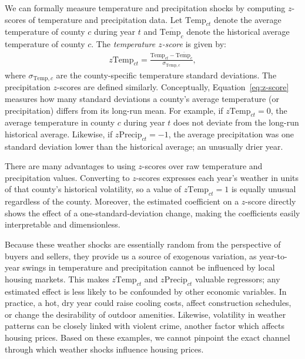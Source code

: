 \documentclass[12pt,reqno]{amsart}
\theoremstyle{definition}
\begin{document}
    We can formally measure temperature and precipitation shocks by computing $z$-scores of temperature and precipitation data. Let $\text{Temp}_{ct}$ denote the average temperature of county $c$ during year $t$ and $\overline{\text{Temp}_c}$ denote the historical average temperature of county $c$. The \textit{temperature $z$-score} is given by:
        \begin{equation}\label{eq:z-score}
        \begin{split}
            z\text{Temp}_{ct} = \frac{\text{Temp}_{ct} - \overline{\text{Temp}_c}}{\sigma_{\text{Temp},c}},
        \end{split}
        \end{equation} 
    where $\sigma_{\text{Temp},c}$ are the county-specific temperature standard deviations. The precipitation $z$-scores are defined similarly. Conceptually, Equation~\ref{eq:z-score} measures how many standard deviations a county's average temperature (or precipitation) differs from its long-run mean. For example, if $z\text{Temp}_{ct} = 0$, the average temperature in county $c$ during year $t$ does not deviate from the long-run historical average. Likewise, if $z\text{Precip}_{ct} = -1$, the average precipitation was one standard deviation lower than the historical average; an unusually drier year.

    There are many advantages to using $z$-scores over raw temperature and precipitation values. Converting to $z$-scores expresses each year's weather in units of that county's historical volatility, so a value of $z\text{Temp}_{ct}=1$ is equally unusual regardless of the county. Moreover, the estimated coefficient on a $z$-score directly shows the effect of a one-standard-deviation change, making the coefficients easily interpretable and dimensionless.

    Because these weather shocks are essentially random from the perspective of buyers and sellers, they provide us a source of exogenous variation, as year-to-year swings in temperature and precipitation cannot be influenced by local housing markets. This makes $z\text{Temp}_{ct}$ and $z\text{Precip}_{ct}$ valuable regressors; any estimated effect is less likely to be confounded by other economic variables. In practice, a hot, dry year could raise cooling costs, affect construction schedules, or change the desirability of outdoor amenities. Likewise, volatility in weather patterns can be closely linked with violent crime, another factor which affects housing prices. Based on these examples, we cannot pinpoint the exact channel through which weather shocks influence housing prices.
\end{document}
